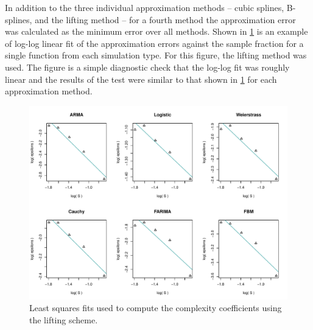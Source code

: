 In addition to the three individual approximation methods -- cubic splines, B-splines, and the lifting method -- for a fourth method the approximation error was calculated as the minimum error over all methods. Shown in \ref{fig:lift-lm} is an example of log-log linear fit of the approximation errors against the sample fraction for a single function from each simulation type. For this figure, the lifting method was used. The figure is a simple diagnostic check that the log-log fit was roughly linear and the results of the test were similar to that shown in \ref{fig:lift-lm} for each approximation method. 


\begin{figure}[!htbp]
  \begin{center}
  \includegraphics[width = \textwidth, keepaspectratio]{./figs/sim_jitter_plot-sim-fits.pdf}
  \end{center} 
  \caption{Least squares fits used to compute the complexity 
  coefficients using the lifting scheme.}
  \label{fig:lift-lm}
\end{figure}


